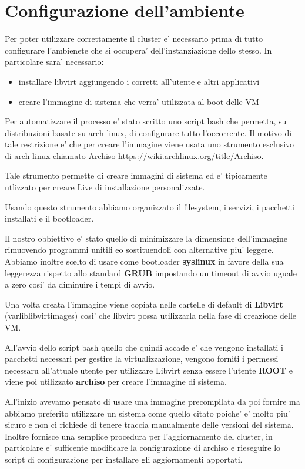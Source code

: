 \section{Configurazione dell'ambiente}
Per poter utilizzare correttamente il cluster e' necessario prima di tutto configurare
l'ambienete che si occupera' dell'instanziazione dello stesso. In particolare sara' necessario:
\begin{itemize}
    \item installare libvirt aggiungendo i corretti all'utente e altri applicativi
    \item creare l'immagine di sistema che verra' utilizzata al boot delle VM
\end{itemize}

Per automatizzare il processo e' stato scritto uno script bash che permetta, 
su distribuzioni basate su arch-linux, di configurare tutto l'occorrente.
Il motivo di tale restrizione e' che per creare l'immagine viene usata uno strumento
esclusivo di arch-linux chiamato Archiso \url{https://wiki.archlinux.org/title/Archiso}.

Tale strumento permette di creare immagini di sistema ed e' tipicamente utlizzato per creare 
Live di installazione personalizzate. 

Usando questo strumento abbiamo organizzato il filesystem, i servizi, i pacchetti installati e il 
bootloader.

Il nostro obbiettivo e' stato quello di minimizzare la dimensione dell'immagine rimuovendo programmi
unitili e\/o sostituendoli con alternative piu' leggere.
Abbiamo inoltre scelto di usare come bootloader \textbf{syslinux} in favore della sua leggerezza 
rispetto allo standard \textbf{GRUB} impostando un timeout di avvio uguale a zero cosi' da diminuire
i tempi di avvio.

Una volta creata l'immagine viene copiata nelle cartelle di default di \textbf{Libvirt} 
(\/var\/lib\/libvirt\/images\/) cosi' che libvirt possa utilizzarla nella fase di creazione
delle VM.

All'avvio dello script bash quello che quindi accade e' che vengono installati i pacchetti
necessari per gestire la virtualizzazione, vengono forniti i permessi necessaru all'attuale utente
per utilizzare Libvirt senza essere l'utente \textbf{ROOT} e viene poi utilizzato 
\textbf{archiso} per creare l'immagine di sistema.

All'inizio avevamo pensato di usare una immagine precompilata da poi fornire ma abbiamo preferito
utilizzare un sistema come quello citato poiche' e' molto piu' sicuro e non ci richiede di tenere
traccia manualmente delle versioni del sistema. Inoltre fornisce una semplice procedura
per l'aggiornamento del cluster, in particolare e' sufficente modificare la configurazione di 
archiso e rieseguire lo script di configurazione per installare gli aggiornamenti apportati. 
